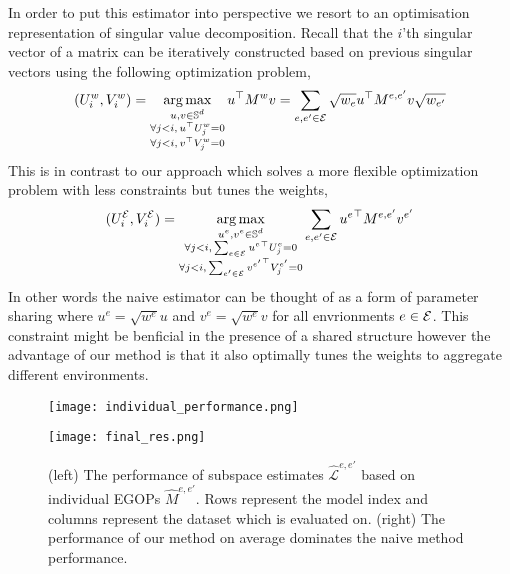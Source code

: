 In order to put this estimator into perspective we resort to an optimisation representation of singular value decomposition.
Recall that the $i$'th singular vector of a matrix can be iteratively constructed based on previous singular vectors using the following optimization problem,
\begin{equation*}
    (U_i^w, V_i^w) = \operatorname*{arg\,max}_{ \substack{u,v \in \mathbb{S}^{d} \\ \forall j < i,\, u^{\top} U_j^{w} = 0 \\ \forall j < i,\, v^{\top} V_j^{w} = 0} } u^{\top} M^w v = \sum_{e,e' \in \mathcal{E}} \sqrt{w_e} u^{\top} M^{e,e'} v \sqrt{w_{e'}}
\end{equation*}
This is in contrast to our approach which solves a more flexible optimization problem with less constraints but tunes the weights,
\begin{equation*}
    (U_i^{\mathcal{E}}, V_i^{\mathcal{E}}) = \operatorname*{arg\,max}_{ \substack{u^{e},v^{e} \in \mathbb{S}^{d} \\ \forall j < i,\, \sum_{e \in \mathcal{E}}  {u^e}^{\top} U_j^{e} = 0 \\ \forall j < i,\, \sum_{e' \in \mathcal{E}} {v^{e'}}^{\top} V_j^{e'} = 0} } \sum_{e,e' \in \mathcal{E}} {u^e}^{\top} M^{e,e'} {v^{e'}} 
\end{equation*}
In other words the naive estimator can be thought of as a form of parameter sharing where $u^{e} = \sqrt{w^{e}} u$ and $v^{e} = \sqrt{w^e} v$ for all envrionments $e \in \mathcal{E}$. This constraint might be benficial in the presence of a shared structure however the advantage of our method is that it also optimally tunes the weights to aggregate different environments.

\begin{figure}[t!]
    \label{fig:results}
    \centering
    \begin{minipage}{0.5\textwidth}
        \centering
        \texttt{[image: individual\_performance.png]}
    \end{minipage}
    \begin{minipage}{0.45\textwidth}
        \centering
        \texttt{[image: final\_res.png]}
    \end{minipage}
    \caption{(left) The performance of subspace estimates $\hat{\mathscr{L}}^{e,e'}$ based on individual EGOPs $\hat{M}^{e,e'}$. Rows represent the model index and columns represent the dataset which is evaluated on. 
    (right) The performance of our method on average dominates the naive method performance.}
\end{figure}

